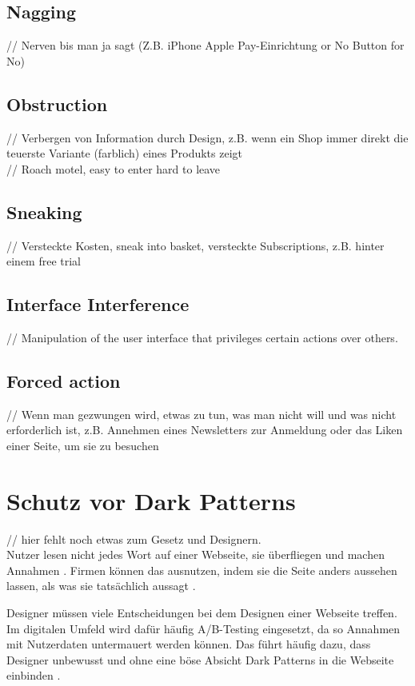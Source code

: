 \documentclass[conference,compsoc,final,a4paper]{IEEEtran}
\begin{document}
\subsection{Nagging}
// Nerven bis man ja sagt (Z.B. iPhone Apple Pay-Einrichtung or No Button for No)
\subsection{Obstruction}
\label{chap:Obstruction}
// Verbergen von Information durch Design, z.B. wenn ein Shop immer direkt die teuerste Variante (farblich) eines Produkts zeigt
\\// Roach motel, easy to enter hard to leave
\subsection{Sneaking}
// Versteckte Kosten, sneak into basket, versteckte Subscriptions, z.B. hinter einem free trial
\subsection{Interface Interference}
// Manipulation of the user interface that privileges certain actions over others.
\subsection{Forced action}
// Wenn man gezwungen wird, etwas zu tun, was man nicht will und was nicht erforderlich ist, z.B. Annehmen eines Newsletters zur Anmeldung oder das Liken einer Seite, um sie zu besuchen


\section{Schutz vor Dark Patterns}
// hier fehlt noch etwas zum Gesetz und Designern.\\
Nutzer lesen nicht jedes Wort auf einer Webseite, sie überfliegen und machen Annahmen \autocite{Brignull}. Firmen können das ausnutzen, indem sie die Seite anders aussehen lassen, als was sie tatsächlich aussagt \autocite{Brignull}.

Designer müssen viele Entscheidungen bei dem Designen einer Webseite treffen. Im digitalen Umfeld wird dafür häufig A/B-Testing eingesetzt, da so Annahmen mit Nutzerdaten untermauert werden können. Das führt häufig dazu, dass Designer unbewusst und ohne eine böse Absicht Dark Patterns in die Webseite einbinden \autocite{Narayanan2020}.
\end{document}
